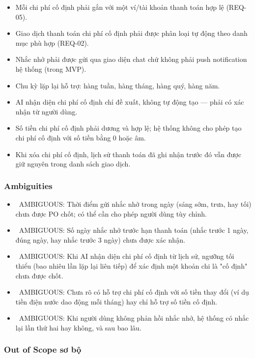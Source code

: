 \begin{itemize}
\item Mỗi chi phí cố định phải gắn với một ví/tài khoản thanh toán hợp lệ (REQ-05).
\item Giao dịch thanh toán chi phí cố định phải được phân loại tự động theo danh mục phù hợp (REQ-02).
\item Nhắc nhở phải được gửi qua giao diện chat chứ không phải push notification hệ thống (trong MVP).
\item Chu kỳ lặp lại hỗ trợ: hàng tuần, hàng tháng, hàng quý, hàng năm.
\item AI nhận diện chi phí cố định chỉ đề xuất, không tự động tạo — phải có xác nhận từ người dùng.
\item Số tiền chi phí cố định phải dương và hợp lệ; hệ thống không cho phép tạo chi phí cố định với số tiền bằng 0 hoặc âm.
\item Khi xóa chi phí cố định, lịch sử thanh toán đã ghi nhận trước đó vẫn được giữ nguyên trong danh sách giao dịch.
\end{itemize}
\subsubsection{Ambiguities}

\begin{itemize}
\item \warningicon\  AMBIGUOUS: Thời điểm gửi nhắc nhở trong ngày (sáng sớm, trưa, hay tối) chưa được PO chốt; có thể cần cho phép người dùng tùy chỉnh.
\item \warningicon\  AMBIGUOUS: Số ngày nhắc nhở trước hạn thanh toán (nhắc trước 1 ngày, đúng ngày, hay nhắc trước 3 ngày) chưa được xác nhận.
\item \warningicon\  AMBIGUOUS: Khi AI nhận diện chi phí cố định từ lịch sử, ngưỡng tối thiểu (bao nhiêu lần lặp lại liên tiếp) để xác định một khoản chi là "cố định" chưa được chốt.
\item \warningicon\  AMBIGUOUS: Chưa rõ có hỗ trợ chi phí cố định với số tiền thay đổi (ví dụ tiền điện nước dao động mỗi tháng) hay chỉ hỗ trợ số tiền cố định.
\item \warningicon\  AMBIGUOUS: Khi người dùng không phản hồi nhắc nhở, hệ thống có nhắc lại lần thứ hai hay không, và sau bao lâu.
\end{itemize}
\subsubsection{Out of Scope sơ bộ}

